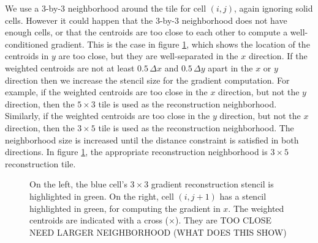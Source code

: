 \begin{enumerate}
We use a 3-by-3 neighborhood around the tile for cell $(i,j)$, again
ignoring solid cells.
However it could happen that the 3-by-3 neighborhood does not have enough cells,
or that the centroids are too close to each other to compute a 
well-conditioned gradient.
This is the case in figure \ref{fig:tooclose}, which shows the location of the
centroids in $y$ are too close, but they are well-separated 
in the  $x$ direction. 
If the weighted centroids are not at least $0.5\,\Delta x$  and $0.5\,\Delta y$ 
apart in the $x$ or $y$ direction then we increase the stencil size for the 
gradient computation.  For example, if the weighted centroids are too close in the $x$ 
direction, but not the $y$ direction, then the $5\times 3$ tile is used as the 
reconstruction neighborhood.  Similarly, if the weighted centroids are too 
close in the $y$ direction, but not the $x$ direction, then the $3\times 5$ tile is 
used as the reconstruction neighborhood.  The neighborhood size is increased until the 
distance constraint is satisfied in both directions.  In figure \ref{fig:tooclose},
the appropriate reconstruction neighborhood is $3\times 5$ reconstruction tile.

\begin{figure}
    \centering
     \hfill
    \caption{\sf On the left, the blue cell's $3\times3$ gradient reconstruction 
    stencil  is highlighted in green. On the right, cell $(i,j+1)$ has a
    stencil highlighted in green, for computing the gradient in $x$. 
    The weighted centroids are indicated with a cross ($\times$).
    They are TOO CLOSE NEED LARGER NEIGHBORHOOD (WHAT DOES THIS SHOW)}
    \label{fig:tooclose}
\end{figure}


\end{enumerate}
